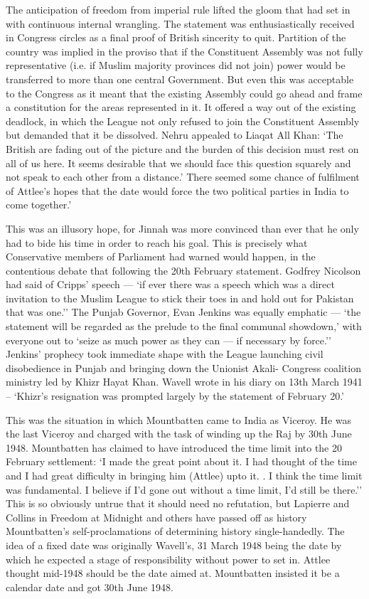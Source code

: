 The anticipation of freedom from imperial rule lifted the gloom that had set in with continuous internal wrangling. The statement was enthusiastically received in Congress circles as a final proof of British sincerity to quit. Partition of the country was implied in the proviso that if the Constituent Assembly was not fully representative (i.e. if Muslim majority provinces did not join) power would be transferred to more than one central Government. But even this was acceptable to the Congress as it meant that the existing Assembly could go ahead and frame a constitution for the areas represented in it. It offered a way out of the existing deadlock, in which the League not only refused to join the Constituent Assembly but demanded that it be dissolved. Nehru appealed to Liaqat All Khan: `The British are fading out of the picture and the burden of this decision must rest on all of us here. It seems desirable that we should face this question squarely and not speak to each other from a distance.' There seemed some chance of fulfilment of Attlee's hopes that the date would force the two political parties in India to come together.' 

This was an illusory hope, for Jinnah was more convinced than ever that he only had to bide his time in order to reach his goal. This is precisely what Conservative members of Parliament had warned would happen, in the contentious debate that following the 20th February statement. Godfrey Nicolson had said of Cripps' speech — `if ever there was a speech which was a direct invitation to the Muslim League to stick their toes in and hold out for Pakistan that was one.'' The Punjab Governor, Evan Jenkins was equally emphatic — `the statement will be regarded as the prelude to the final communal showdown,' with everyone out to `seize as much power as they can — if necessary by force.'' Jenkins' prophecy took immediate shape with the League launching civil disobedience in Punjab and bringing down the Unionist Akali- Congress coalition ministry led by Khizr Hayat Khan. Wavell wrote in his diary on 13th March 1941 -- `Khizr's resignation was prompted largely by the statement of February 20.' 

This was the situation in which Mountbatten came to India as Viceroy. He was the last Viceroy and charged with the task of winding up the Raj by 30th June 1948. Mountbatten has claimed to have introduced the time limit into the 20 February settlement: `I made the great point about it. I had thought of the time and I had great difficulty in bringing him (Attlee) upto it. . I think the time limit was fundamental. I believe if I'd gone out without a time limit, I'd still be there.'' This is so obviously untrue that it should need no refutation, but Lapierre and Collins in Freedom at Midnight and others have passed off as history Mountbatten's self-proclamations of determining history single-handedly. The idea of a fixed date was originally Wavell's, 31 March 1948 being the date by which he expected a stage of responsibility without power to set in. Attlee thought mid-1948 should be the date aimed at. Mountbatten insisted it be a calendar date and got 30th June 1948. 

